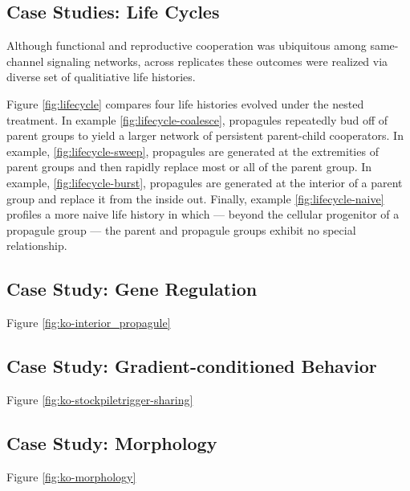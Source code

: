 \subsection{Case Studies: Life Cycles} \label{sec:life-cycles}

Although functional and reproductive cooperation was ubiquitous among same-channel signaling networks, across replicates these outcomes were realized via diverse set of qualitiative life histories.


Figure \ref{fig:lifecycle} compares four life histories evolved under the nested treatment.
In example \ref{fig:lifecycle-coalesce}, propagules repeatedly bud off of parent groups to yield a larger network of persistent parent-child cooperators.
In example, \ref{fig:lifecycle-sweep}, propagules are generated at the extremities of parent groups and then rapidly replace most or all of the parent group.
In example, \ref{fig:lifecycle-burst}, propagules are generated at the interior of a parent group and replace it from the inside out.
Finally, example \ref{fig:lifecycle-naive} profiles a more naive life history in which --- beyond the cellular progenitor of a propagule group --- the parent and propagule groups exhibit no special relationship.

\subsection{Case Study: Gene Regulation} \label{sec:gene-regulation}



Figure \ref{fig:ko-interior_propagule}

\subsection{Case Study: Gradient-conditioned Behavior} \label{sec:gradient-conditioned-behavior}



Figure \ref{fig:ko-stockpiletrigger-sharing}

\subsection{Case Study: Morphology} \label{sec:morphology}



Figure \ref{fig:ko-morphology}

